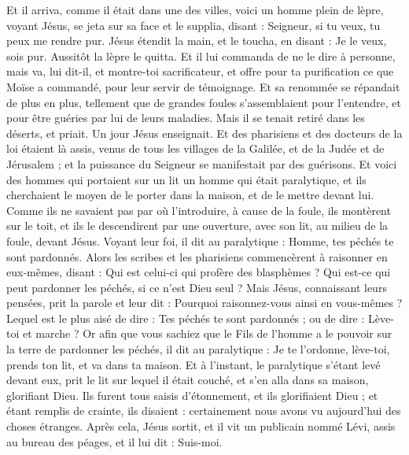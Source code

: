 \begin{multicols}{2}
Et il arriva, comme il était dans une des villes, voici un homme plein de lèpre, voyant Jésus, se jeta sur sa face et le supplia, disant : Seigneur, si tu veux, tu peux me rendre pur.
Jésus étendit la main, et le toucha, en disant : Je le veux, sois pur. Aussitôt la lèpre le quitta.
Et il lui commanda de ne le dire à personne, mais va, lui dit-il, et montre-toi sacrificateur, et offre pour ta purification ce que Moïse a commandé, pour leur servir de témoignage.
Et sa renommée se répandait de plus en plus, tellement que de grandes foules s’assemblaient pour l’entendre, et pour être guéries par lui de leurs maladies.
Mais il se tenait retiré dans les déserts, et priait.
Un jour Jésus enseignait. Et des pharisiens et des docteurs de la loi étaient là assis, venus de tous les villages de la Galilée, et de la Judée et de Jérusalem ; et la puissance du Seigneur se manifestait par des guérisons.
Et voici des hommes qui portaient sur un lit un homme qui était paralytique, et ils cherchaient le moyen de le porter dans la maison, et de le mettre devant lui.
Comme ils ne savaient pas par où l'introduire, à cause de la foule, ils montèrent sur le toit, et ils le descendirent par une ouverture, avec son lit, au milieu de la foule, devant Jésus.
Voyant leur foi, il dit au paralytique : Homme, tes péchés te sont pardonnés.
Alors les scribes et les pharisiens commencèrent à raisonner en eux-mêmes, disant : Qui est celui-ci qui profère des blasphèmes ? Qui est-ce qui peut pardonner les péchés, si ce n'est Dieu seul ?
Mais Jésus, connaissant leurs pensées, prit la parole et leur dit : Pourquoi raisonnez-vous ainsi en vous-mêmes ?
Lequel est le plus aisé de dire : Tes péchés te sont pardonnés ; ou de dire : Lève-toi et marche ?
Or afin que vous sachiez que le Fils de l'homme a le pouvoir sur la terre de pardonner les péchés, il dit au paralytique : Je te l'ordonne, lève-toi, prends ton lit, et va dans ta maison.
Et à l'instant, le paralytique s'étant levé devant eux, prit le lit sur lequel il était couché, et s'en alla dans sa maison, glorifiant Dieu.
Ils furent tous saisis d'étonnement, et ils glorifiaient Dieu ; et étant remplis de crainte, ils disaient : certainement nous avons vu aujourd'hui des choses étranges.
Après cela, Jésus sortit, et il vit un publicain nommé Lévi, assis au bureau des péages, et il lui dit : Suis-moi.

\end{multicols}
